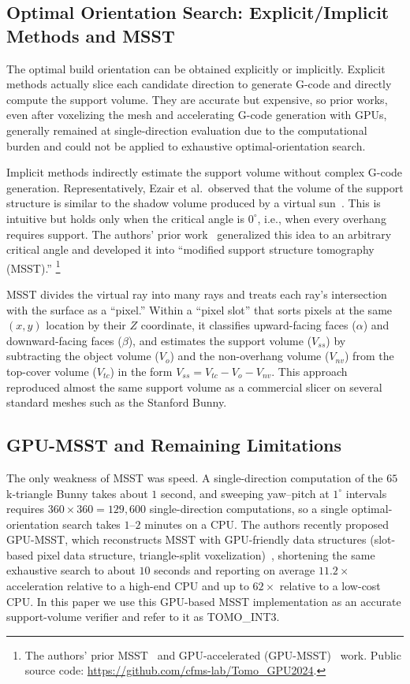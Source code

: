 \documentclass[11pt,a4paper]{article}
\begin{document}
\subsection{Optimal Orientation Search: Explicit/Implicit Methods and MSST}

The optimal build orientation can be obtained explicitly or implicitly.
Explicit methods actually slice each candidate direction to generate G-code and directly compute the support volume.
They are accurate but expensive, so prior works, even after voxelizing the mesh and accelerating G-code generation with GPUs,
generally remained at single-direction evaluation due to the computational burden and could not be applied to exhaustive optimal-orientation search.

Implicit methods indirectly estimate the support volume without complex G-code generation.
Representatively, Ezair et al.\ observed that the volume of the support structure is similar to the shadow volume produced by a virtual sun~\cite{ezair}.
This is intuitive but holds only when the critical angle is $0^\circ$, i.e., when every overhang requires support.
The authors' prior work~\cite{msst} generalized this idea to an arbitrary critical angle
and developed it into ``modified support structure tomography (MSST).''%
\footnote{The authors' prior MSST~\cite{msst} and GPU-accelerated (GPU-MSST)~\cite{gpumsst} work. Public source code:
\url{https://github.com/cfms-lab/Tomo_GPU2024}.}

MSST divides the virtual ray into many rays and treats each ray's intersection with the surface as a ``pixel.''
Within a ``pixel slot'' that sorts pixels at the same $(x,y)$ location by their $Z$ coordinate,
it classifies upward-facing faces ($\alpha$) and downward-facing faces ($\beta$),
and estimates the support volume ($V_{ss}$) by subtracting the object volume ($V_o$) and the
non-overhang volume ($V_{nv}$) from the top-cover volume ($V_{tc}$) in the form $V_{ss}=V_{tc}-V_o-V_{nv}$.
This approach reproduced almost the same support volume as a commercial slicer on several standard meshes such as the Stanford Bunny.

\subsection{GPU-MSST and Remaining Limitations}

The only weakness of MSST was speed.
A single-direction computation of the $65$k-triangle Bunny takes about $1$ second,
and sweeping yaw--pitch at $1^\circ$ intervals requires $360\times360=129{,}600$ single-direction computations,
so a single optimal-orientation search takes $1$--$2$ minutes on a CPU.
The authors recently proposed GPU-MSST, which reconstructs MSST with GPU-friendly data structures (slot-based pixel data structure, triangle-split voxelization)~\cite{gpumsst},
shortening the same exhaustive search to about $10$ seconds and reporting on average $11.2\times$ acceleration relative to a high-end CPU and up to $62\times$ relative to a low-cost CPU.
In this paper we use this GPU-based MSST implementation as an accurate support-volume verifier and refer to it as TOMO\_INT3.
\end{document}
